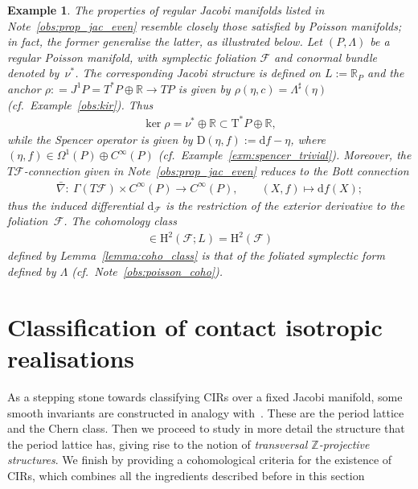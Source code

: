 \documentclass[pdftex]{sigma}
\numberwithin{equation}{section}
\newtheorem{Example}[Theorem]{Example}
\newcommand{\de}{\mathrm{d}} %
\newcommand{\PM}{(P,\Lambda)} %
\newcommand{\cotan}{\mathrm{T}^*} %
\newcommand{\HH}{\mathrm{H}}
\newcommand{\RR}{\mathbb{R}}
\newcommand{\ZZ}{\mathbb{Z}}
\begin{document}
\begin{Example}\label{exm:Poisson_case}
The properties of regular Jacobi manifolds listed in Note~\ref{obs:prop_jac_even} resemble closely those satisf\/ied by Poisson manifolds; in fact, the former generalise the latter, as illustrated below. Let $\PM$ be a regular Poisson manifold, with symplectic foliation $\mathcal{F}$ and conormal bundle denoted by~$\nu^*$. The corresponding Jacobi structure is def\/ined on $L := \RR_{P}$ and the anchor $ \rho: =J^1P=T^*P\oplus \RR \to TP$ is given by $\rho(\eta, c) = \Lambda^{\sharp}(\eta)$ (cf.\ Example~\ref{obs:kir}). Thus
 \begin{gather*}
 \ker \rho = \nu^* \oplus \RR \subset \cotan P \oplus \RR,
 \end{gather*}
while the Spencer operator is given by $ \mathrm{D}(\eta,f) := \de f - \eta$, where $(\eta,f) \in \Omega^1(P) \oplus C^{\infty}(P)$ (cf.\ Example~\ref{exm:spencer_trivial}). Moreover, the $T\mathcal{F}$-connection given in Note~\ref{obs:prop_jac_even} reduces to the Bott connection
 \begin{gather*}
 \bar{\nabla} \colon \ \Gamma(T\mathcal{F}) \times C^{\infty}(P) \to
 C^{\infty}(P), \qquad (X,f) \mapsto \de f(X);
 \end{gather*}
thus the induced dif\/ferential $\de_{\mathcal{F}}$ is the restriction of the exterior derivative to the foliation~$\mathcal{F}$. The cohomology class
 \begin{gather*}
 [\omega_{\mathcal{F}}] \in \HH^2(\mathcal{F};L) = \HH^2(\mathcal{F})
\end{gather*}
def\/ined by Lemma~\ref{lemma:coho_class} is that of the foliated symplectic form def\/ined by $\Lambda$ (cf.\ Note~\ref{obs:poisson_coho}).
\end{Example}

\section{Classif\/ication of contact isotropic realisations}\label{sec:smooth-invar-cirs}
As a stepping stone towards classifying CIRs over a f\/ixed Jacobi manifold, some smooth invariants are constructed in analogy with~\cite{dd}. These are the period lattice and the Chern class. Then we proceed to study in more detail the structure that the period lattice has, giving rise to the notion of {\it transversal $\ZZ$-projective structures}. We f\/inish by providing a cohomological criteria for the existence of CIRs, which combines all the ingredients described before in this section
\end{document}
